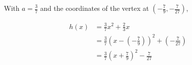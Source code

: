\begin{solution}
With $a = \frac{3}{7}$ and the coordinates of the vertex at $\left(-\frac{7}{9}, -\frac{7}{27}\right)$,

\begin{align*}
h(x) &= \tfrac{3}{7}x^2 + \tfrac{2}{3}x \\
&= \tfrac{3}{7}\left(x-\left(-\tfrac{7}{9}\right)\right)^2 + \left(-\tfrac{7}{27}\right) \\
&= \boxed{\tfrac{3}{7}\left(x + \tfrac{7}{9}\right)^2 - \tfrac{7}{27}}
\end{align*}


\end{solution}